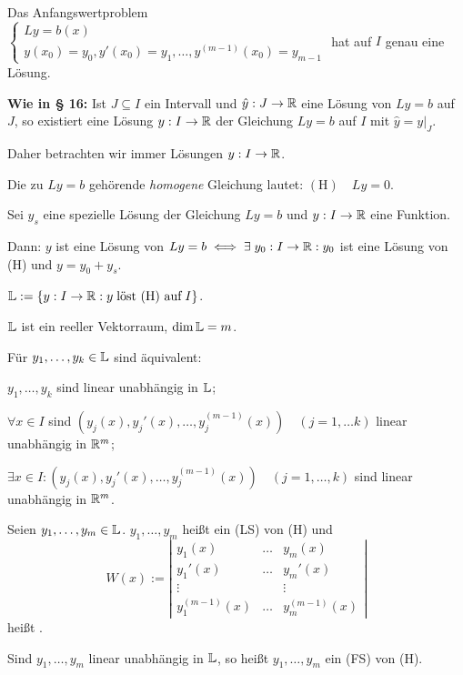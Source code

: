 \documentclass[a4paper,twoside,DIV15,BCOR12mm]{scrbook}
\begin{document}
\begin{satz} %
Das Anfangswertproblem $\begin{cases}Ly=b(x)\\y(x_0)=y_0, y'(x_0)=y_1, \ldots, y^{(m-1)}(x_0)=y_{m-1}\end{cases}$ hat auf $I$ genau eine Lösung.
\end{satz}

{\bf Wie in § 16:} Ist $J \subseteq I$ ein Intervall und $\hat{y}:J\rightarrow \mathbb{R}$
eine Lösung von $Ly=b$ auf $J$, so existiert eine Lösung $y:I\rightarrow \mathbb{R}$
der Gleichung $Ly=b$ auf $I$ mit $\hat{y}=y|_J$.

Daher betrachten wir immer Lösungen $y:I\rightarrow \mathbb{R}$.

Die zu $Ly=b$ gehörende \emph{homogene} Gleichung lautet: $(\text{H})\quad Ly=0$.

\begin{satz} %
Sei $y_s$ eine spezielle Lösung der Gleichung $Ly=b$ und $y:I\rightarrow \mathbb{R}$ eine Funktion.

Dann: $y$ ist eine Lösung von $Ly=b \iff \exists \; y_0:I\rightarrow \mathbb{R}: y_0$ ist eine Lösung von (H) und $y = y_0 + y_s$.

$\mathbb{L} := \{ y:I\rightarrow \mathbb{R}: y\; \text{löst (H) auf}\; I \}$.
\end{satz}

\begin{satz} %
\begin{liste}
\item $\mathbb{L}$ ist ein reeller Vektorraum, $\dim \mathbb{L} = m$.
\item Für $y_1, \ldots, y_k \in \mathbb{L}$ sind äquivalent:
\begin{liste}
\item $y_1, \ldots, y_k$ sind linear unabhängig in $\mathbb{L}$;
\item $\forall x \in I$ sind $(y_j(x), y_j'(x), \ldots, y_j^{(m-1)}(x))\quad (j=1,\ldots k)$ linear unabhängig in $\mathbb{R}^m$;
\item $\exists x \in I:(y_j(x), y_j'(x), \ldots, y_j^{(m-1)}(x))\quad (j=1,\ldots, k)$ sind linear unabhängig in $\mathbb{R}^m$.
\end{liste}
\end{liste}
\end{satz}

\begin{definition} 
Seien $y_1, \ldots, y_m \in \mathbb{L}$. $y_1, \ldots, y_m$ heißt ein
 (LS) von (H) und
\[W(x) := \left|\begin{array}{ccc}
y_1(x) & \ldots & y_m(x)\\y_1'(x) & \ldots & y_m'(x)\\ \vdots & & \vdots\\
y_1^{(m-1)}(x) & \ldots & y_m^{(m-1)}(x)\end{array}\right|\] heißt
.

Sind $y_1, \ldots, y_m$ linear unabhängig in $\mathbb{L}$, so heißt $y_1, \ldots, y_m$ ein  (FS) von (H).
\end{definition}
\end{document}
